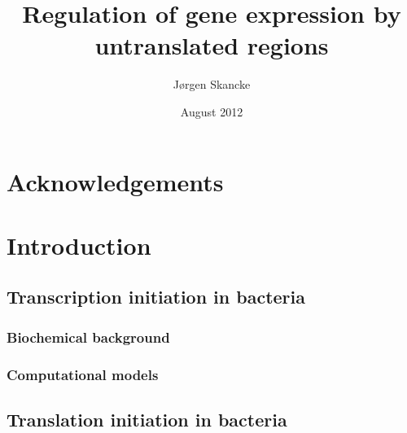 \documentclass[]{ntnuthesis}
\title{Regulation of gene expression by untranslated regions}
\author{J\o rgen Skancke}
\date{August 2012}
\begin{document}
 

\frontmatter


\chapter*{Acknowledgements}



\mainmatter

\chapter{Introduction}



\section{Transcription initiation in bacteria}
\subsection{Biochemical background}

\subsection{Computational models}


\section{Translation initiation in bacteria}


%
%
\end{document}
